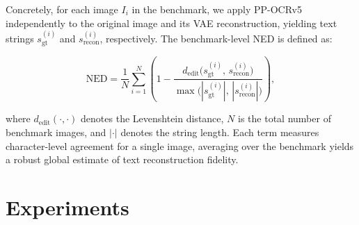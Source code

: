 \documentclass{llmxive}
\begin{document}
Concretely, for each image $I_i$ in the benchmark, we apply PP-OCRv5 independently to the original image and its VAE reconstruction, yielding text strings $s_{\mathrm{gt}}^{(i)}$ and $s_{\mathrm{recon}}^{(i)}$, respectively. The benchmark-level NED is defined as:

\begin{equation}
\mathrm{NED} = \frac{1}{N}\sum_{i=1}^{N}\left(1 - \frac{d_{\mathrm{edit}}\!\bigl(s_{\mathrm{gt}}^{(i)},\, s_{\mathrm{recon}}^{(i)}\bigr)}{\max\!\bigl(|s_{\mathrm{gt}}^{(i)}|,\, |s_{\mathrm{recon}}^{(i)}|\bigr)}\right),
\label{eq:ocr_ned}
\end{equation}

where $d_{\mathrm{edit}}(\cdot,\cdot)$ denotes the Levenshtein distance, $N$ is the total number of benchmark images, and $|\cdot|$ denotes the string length. Each term measures character-level agreement for a single image, averaging over the benchmark yields a robust global estimate of text reconstruction fidelity.


\section{Experiments}
\end{document}
